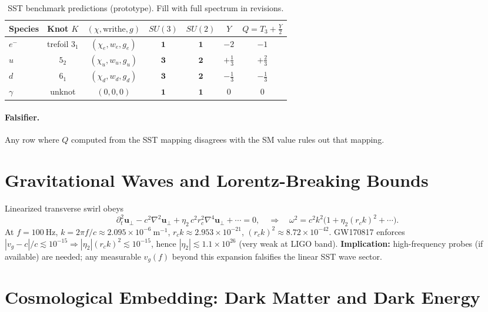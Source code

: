 \documentclass[10pt,reprint,aps,onecolumn,nofootinbib]{revtex4-2}
\newcommand{\rc}{r_c}                                    %
\begin{document}
\begin{table}[h]
\centering
\caption{SST benchmark predictions (prototype). Fill with full spectrum in revisions.}
\begin{tabular}{lcccccc}
\hline
Species & Knot $K$ & $(\chi,\text{writhe},g)$ & $SU(3)$ & $SU(2)$ & $Y$ & $Q=T_3+\tfrac{Y}{2}$\\
\hline
$e^-$ & trefoil $3_1$ & $(\chi_e, w_e, g_e)$ & $\mathbf{1}$ & $\mathbf{1}$ & $-2$ & $-1$\\
$u$ & $5_2$ & $(\chi_u, w_u, g_u)$ & $\mathbf{3}$ & $\mathbf{2}$ & $+\tfrac{1}{3}$ & $+\tfrac{2}{3}$\\
$d$ & $6_1$ & $(\chi_d, w_d, g_d)$ & $\mathbf{3}$ & $\mathbf{2}$ & $-\tfrac{1}{3}$ & $-\tfrac{1}{3}$\\
$\gamma$ & unknot & $(0,0,0)$ & $\mathbf{1}$ & $\mathbf{1}$ & $0$ & $0$\\
\hline
\end{tabular}
\end{table}

\paragraph{Falsifier.} Any row where $Q$ computed from the SST mapping disagrees with the SM value rules out that mapping.

\section{Gravitational Waves and Lorentz-Breaking Bounds}
\label{sec:SST-GW}

Linearized transverse swirl obeys
\[
    \partial_t^2 \mathbf{u}_\perp - c^2 \nabla^2 \mathbf{u}_\perp
    + \eta_2\,c^2\rc^2\nabla^4 \mathbf{u}_\perp + \cdots = 0,
    \quad\Rightarrow\quad
    \omega^2=c^2k^2\big(1+\eta_2(\rc k)^2+\cdots\big).
\]
At \(f=100\ \mathrm{Hz}\), \(k=2\pi f/c\approx 2.095\times10^{-6}\ \mathrm{m^{-1}}\),
\(\rc k\approx 2.953\times10^{-21}\), \((\rc k)^2\approx 8.72\times10^{-42}\).
GW170817 enforces \(|v_g-c|/c\lesssim10^{-15}\Rightarrow |\eta_2|(\rc k)^2\lesssim10^{-15}\),
hence \(|\eta_2|\lesssim 1.1\times10^{26}\) (very weak at LIGO band).
\textbf{Implication:} high-frequency probes (if available) are needed; any measurable \(v_g(f)\) beyond this expansion falsifies the linear SST wave sector.



\section{Cosmological Embedding: Dark Matter and Dark Energy}
\label{sec:SST-cosmo}
\end{document}
